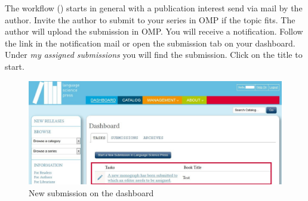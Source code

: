 The workflow () starts in general with a publication interest send via mail by the author. Invite the author to submit to your series in OMP if the topic fits. The author will upload the submission in OMP. 
You will receive a notification. Follow the link in the notification mail or open the submission tab on your dashboard. Under \textit{my assigned submissions} you will find the submission. Click on the title to start. 

\begin{figure}[h] \centering
\includegraphics[width=1\textwidth]{./img/editor-1.jpg} \caption{New submission on the dashboard}
\label{fig:editor1}
\end{figure}







